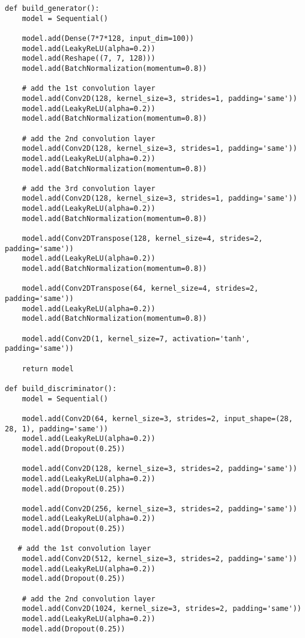 \begin{lstlisting}[style=mypython, caption=Explore GAN with more convolutional layers 6]
    def build_generator():
    model = Sequential()
    
    model.add(Dense(7*7*128, input_dim=100))
    model.add(LeakyReLU(alpha=0.2))
    model.add(Reshape((7, 7, 128)))
    model.add(BatchNormalization(momentum=0.8))

    # add the 1st convolution layer
    model.add(Conv2D(128, kernel_size=3, strides=1, padding='same'))
    model.add(LeakyReLU(alpha=0.2))
    model.add(BatchNormalization(momentum=0.8))

    # add the 2nd convolution layer
    model.add(Conv2D(128, kernel_size=3, strides=1, padding='same'))
    model.add(LeakyReLU(alpha=0.2))
    model.add(BatchNormalization(momentum=0.8))

    # add the 3rd convolution layer
    model.add(Conv2D(128, kernel_size=3, strides=1, padding='same'))
    model.add(LeakyReLU(alpha=0.2))
    model.add(BatchNormalization(momentum=0.8))

    model.add(Conv2DTranspose(128, kernel_size=4, strides=2, padding='same'))
    model.add(LeakyReLU(alpha=0.2))
    model.add(BatchNormalization(momentum=0.8))

    model.add(Conv2DTranspose(64, kernel_size=4, strides=2, padding='same'))
    model.add(LeakyReLU(alpha=0.2))
    model.add(BatchNormalization(momentum=0.8))

    model.add(Conv2D(1, kernel_size=7, activation='tanh', padding='same'))

    return model

def build_discriminator():
    model = Sequential()
    
    model.add(Conv2D(64, kernel_size=3, strides=2, input_shape=(28, 28, 1), padding='same'))
    model.add(LeakyReLU(alpha=0.2))
    model.add(Dropout(0.25))

    model.add(Conv2D(128, kernel_size=3, strides=2, padding='same'))
    model.add(LeakyReLU(alpha=0.2))
    model.add(Dropout(0.25))

    model.add(Conv2D(256, kernel_size=3, strides=2, padding='same'))
    model.add(LeakyReLU(alpha=0.2))
    model.add(Dropout(0.25))

   # add the 1st convolution layer
    model.add(Conv2D(512, kernel_size=3, strides=2, padding='same'))
    model.add(LeakyReLU(alpha=0.2))
    model.add(Dropout(0.25))

    # add the 2nd convolution layer
    model.add(Conv2D(1024, kernel_size=3, strides=2, padding='same'))
    model.add(LeakyReLU(alpha=0.2))
    model.add(Dropout(0.25))


\end{lstlisting}
